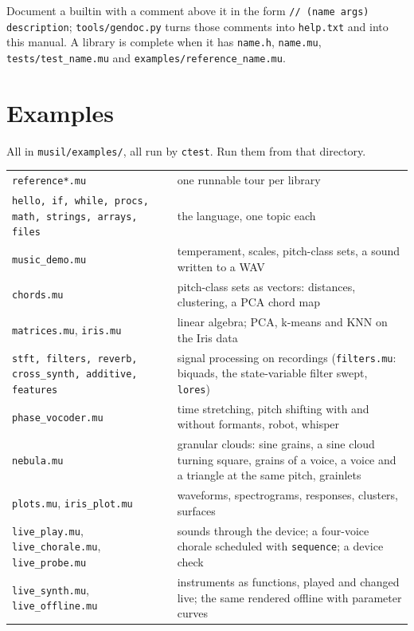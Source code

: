 \documentclass[11pt,a4paper]{article}
\newcommand{\musil}[1]{\lstinline[style=musilinline]{#1}}
\begin{document}
Document a builtin with a comment above it in the form
\texttt{// (name args) description}; \texttt{tools/gendoc.py} turns those comments
into \texttt{help.txt} and into this manual. A library is complete when it has
\texttt{name.h}, \texttt{name.mu}, \texttt{tests/test\_name.mu} and
\texttt{examples/reference\_name.mu}.

\section{Examples}

All in \texttt{musil/examples/}, all run by \texttt{ctest}. Run them from that directory.

\begin{center}
\begin{tabular}{@{}ll@{}}
\toprule
\texttt{reference*.mu} & one runnable tour per library \\
\texttt{hello, if, while, procs, math, strings, arrays, files} & the language, one topic each \\
\texttt{music\_demo.mu} & temperament, scales, pitch-class sets, a sound written to a WAV \\
\texttt{chords.mu} & pitch-class sets as vectors: distances, clustering, a PCA chord map \\
\texttt{matrices.mu}, \texttt{iris.mu} & linear algebra; PCA, k-means and KNN on the Iris data \\
\texttt{stft, filters, reverb, cross\_synth, additive, features} & signal processing on recordings (\texttt{filters.mu}: biquads, the state-variable filter swept, \musil{lores}) \\
\texttt{phase\_vocoder.mu} & time stretching, pitch shifting with and without formants, robot, whisper \\
\texttt{nebula.mu} & granular clouds: sine grains, a sine cloud turning square, grains of a voice, a voice and a triangle at the same pitch, grainlets \\
\texttt{plots.mu}, \texttt{iris\_plot.mu} & waveforms, spectrograms, responses, clusters, surfaces \\
\texttt{live\_play.mu}, \texttt{live\_chorale.mu}, \texttt{live\_probe.mu} & sounds through the device; a four-voice chorale scheduled with \musil{sequence}; a device check \\
\texttt{live\_synth.mu}, \texttt{live\_offline.mu} & instruments as functions, played and changed live; the same rendered offline with parameter curves \\

\end{tabular}
\end{center}
\end{document}
